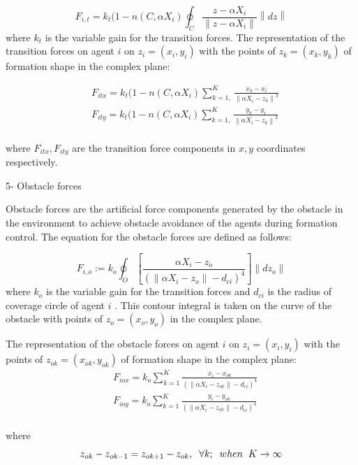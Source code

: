 \documentclass[twoside]{article}
\newcommand{\norm}[1]{\left\lVert#1\right\rVert}
\begin{document}
				\begin{equation}
 F_{i,t} = k_t (1-n(C,\alpha X_i) \oint_C \frac{z-\alpha X_i}{\norm{z-\alpha X_i}}\norm{dz}
				\end{equation}
				where $k_t$ is the variable gain for the transition forces. The representation of the transition forces on agent $i$ on $z_i = (x_i, y_i)$ with the points of  $z_k = (x_k,y_k)$ of formation shape in the complex plane:
			
\begin{align*}
&F_{itx} = k_t  (1-n(C,\alpha X_i) \sum_{k=1,}^{K}\frac{x_k- x_i}{\norm{\alpha X_i - z_k}^3}\\
&F_{ity} = k_t  (1-n(C,\alpha X_i) \sum_{k=1,}^{K}\frac{y_k- y_i}{\norm{\alpha X_i - z_k}^3}\\
\end{align*}
			
			where  $F_{itx} , F_{ity} $ are the transition force components in $x,y$ coordinates respectively.
			
			5- Obstacle forces
			
			Obstacle forces are the artificial force components generated by the obstacle in the environment to achieve obstacle avoidance of the agents during formation control. 	
			The equation for the obstacle forces are defined as follows:	
			
			\begin{equation}
F_{i,o} := k_o  \oint_O \left[\frac{\alpha X_i - z_o}{(\norm{\alpha X_i - z_o} - d_{ci})^4}\right] \norm{dz_o}
			\end{equation}
			where $k_o$ is the variable gain for the transition forces and $d_{ci}$ is the radius of coverage circle of agent $i$ . This contour integral is taken on the curve of the obstacle with  points of $z_o = (x_o,y_o)$ in the complex plane.
			
			The representation of the obstacle forces on agent $i$ on $z_i = (x_i, y_i)$ with the points of  $z_{ok} = (x_{ok},y_{ok})$ of formation shape in the complex plane:
			\begin{align*}
			& F_{iox} = k_o   \sum_{k=1}^{K} \frac{x_i -x_{ok}}{(\norm{\alpha X_i - z_{ok}} -d_{ci})^4}\\
			& F_{ioy} = k_o   \sum_{k=1}^{K} \frac{y_i - y_{ok}}{(\norm{\alpha X_i - z_{ok}} -d_{ci})^4}\\
			\end{align*}
			
			where
			\begin{equation}
		z_{ok}- z_{ok -1} = z_{ok+1} - z_{ok}, \hspace{0.2cm}  \forall k ;  \hspace{0.2cm} when  \hspace{0.2cm} K \to\infty
			\end{equation}
			
\end{document}
